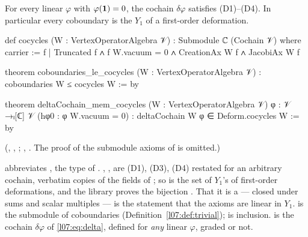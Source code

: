 \begin{theorem}\label{l07:thm:cobcoc}
For every linear $\varphi$ with $\varphi(\mathbf{1}) = 0$, the cochain $\delta\varphi$ satisfies
(D1)--(D4). In particular every coboundary is the $Y_1$ of a first-order deformation.
\end{theorem}
\begin{leancode}
def cocycles (W : VertexOperatorAlgebra 𝒱) : Submodule ℂ (Cochain 𝒱) where
  carrier := {f | Truncated f ∧ f W.vacuum = 0 ∧ CreationAx W f ∧ JacobiAx W f}

theorem coboundaries_le_cocycles (W : VertexOperatorAlgebra 𝒱) :
    coboundaries W ≤ cocycles W := by

theorem deltaCochain_mem_cocycles (W : VertexOperatorAlgebra 𝒱) {φ : 𝒱 →ₗ[ℂ] 𝒱}
    (hφ0 : φ W.vacuum = 0) : deltaCochain W φ ∈ Deform.cocycles W := by
\end{leancode}
(, ,
; ,
. The proof
of the submodule axioms of  is omitted.)

\begin{dictionary}
 abbreviates , the type of .
, ,  are (D1), (D3), (D4) restated for an arbitrary
cochain, verbatim copies of the fields of ; so  is the
set of $Y_1$'s of first-order deformations, and the library proves the bijection
. That it is a
 --- closed under sums and scalar multiples --- is the statement that the axioms
are linear in $Y_1$.  is the submodule of coboundaries
(Definition~\ref{l07:def:trivial});  is inclusion.  is the cochain
$\delta\varphi$ of \eqref{l07:eq:delta}, defined for \emph{any} linear $\varphi$, graded or not.
\end{dictionary}

